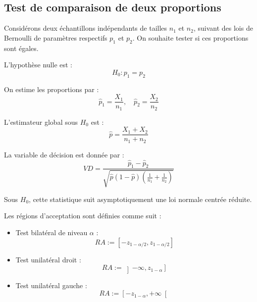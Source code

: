 \subsection{Test de comparaison de deux proportions}

Considérons deux échantillons indépendants de tailles $n_1$ et $n_2$,
suivant des lois de Bernoulli de paramètres respectifs $p_1$ et $p_2$.
On souhaite tester si ces proportions sont égales.

L'hypothèse nulle est :
\[
H_0 : p_1 = p_2
\]

On estime les proportions par :
\[
\hat{p}_1 = \frac{X_1}{n_1}, \quad \hat{p}_2 = \frac{X_2}{n_2}
\]

L'estimateur global sous $H_0$ est :
\[
\hat{p} = \frac{X_1 + X_2}{n_1 + n_2}
\]

La variable de décision est donnée par :
\[
VD = \frac{\hat{p}_1 - \hat{p}_2}{\sqrt{\hat{p}(1-\hat{p}) 
\left( \frac{1}{n_1} + \frac{1}{n_2} \right)}}
\]

Sous $H_0$, cette statistique suit asymptotiquement une loi normale 
centrée réduite.

Les régions d'acceptation sont définies comme suit :
\begin{itemize}
    \item Test bilatéral de niveau $\alpha$ :
        \[
        RA := \left[ -z_{1-\alpha/2}, z_{1-\alpha/2} \right]
        \]
    \item Test unilatéral droit :
        \[
        RA := \left] -\infty, z_{1-\alpha} \right]
        \]
    \item Test unilatéral gauche :
        \[
        RA := \left[ -z_{1-\alpha}, +\infty \right[
        \]
\end{itemize}

